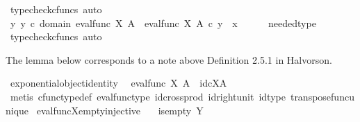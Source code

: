 \begin{isabellebody}
\ {\isacharparenleft}{\kern0pt}typecheck{\isacharunderscore}{\kern0pt}cfuncs{\isacharcomma}{\kern0pt}\ auto{\isacharparenright}{\kern0pt}\isanewline
\ \ \isamarkupfalse%
\ \isamarkupfalse%
\ {\isachardoublequoteopen}{\isasymexists}y{\isachardot}{\kern0pt}\ y\ {\isasymin}\isactrlsub c\ domain\ {\isacharparenleft}{\kern0pt}eval{\isacharunderscore}{\kern0pt}func\ X\ A{\isacharparenright}{\kern0pt}\ {\isasymand}\ eval{\isacharunderscore}{\kern0pt}func\ X\ A\ {\isasymcirc}\isactrlsub c\ y\ {\isacharequal}{\kern0pt}\ x{\isachardoublequoteclose}\isanewline
\ \ \ \ \isamarkupfalse%
\ needed{\isacharunderscore}{\kern0pt}type\ \isamarkupfalse%
\ {\isacharparenleft}{\kern0pt}typecheck{\isacharunderscore}{\kern0pt}cfuncs{\isacharcomma}{\kern0pt}\ auto{\isacharparenright}{\kern0pt}\isanewline
{}\isamarkupfalse%
%
\endisatagproof
{\isafoldproof}%
%
\isadelimproof
%
\endisadelimproof
%
\begin{isamarkuptext}%
The lemma below corresponds to a note above Definition 2.5.1 in Halvorson.%
\end{isamarkuptext}\isamarkuptrue%
\isamarkupfalse%
\ exponential{\isacharunderscore}{\kern0pt}object{\isacharunderscore}{\kern0pt}identity{\isacharcolon}{\kern0pt}\isanewline
\ \ {\isachardoublequoteopen}{\isacharparenleft}{\kern0pt}eval{\isacharunderscore}{\kern0pt}func\ X\ A{\isacharparenright}{\kern0pt}\isactrlsup {\isasymsharp}\ {\isacharequal}{\kern0pt}\ id\isactrlsub c{\isacharparenleft}{\kern0pt}X\isactrlbsup A\isactrlesup {\isacharparenright}{\kern0pt}{\isachardoublequoteclose}\isanewline
%
\isadelimproof
\ \ %
\endisadelimproof
%
\isatagproof
{}\isamarkupfalse%
\ {\isacharparenleft}{\kern0pt}metis\ cfunc{\isacharunderscore}{\kern0pt}type{\isacharunderscore}{\kern0pt}def\ eval{\isacharunderscore}{\kern0pt}func{\isacharunderscore}{\kern0pt}type\ id{\isacharunderscore}{\kern0pt}cross{\isacharunderscore}{\kern0pt}prod\ id{\isacharunderscore}{\kern0pt}right{\isacharunderscore}{\kern0pt}unit\ id{\isacharunderscore}{\kern0pt}type\ transpose{\isacharunderscore}{\kern0pt}func{\isacharunderscore}{\kern0pt}unique{\isacharparenright}{\kern0pt}%
\endisatagproof
{\isafoldproof}%
%
\isadelimproof
\isanewline
%
\endisadelimproof
\isanewline
{}\isamarkupfalse%
\ eval{\isacharunderscore}{\kern0pt}func{\isacharunderscore}{\kern0pt}X{\isacharunderscore}{\kern0pt}empty{\isacharunderscore}{\kern0pt}injective{\isacharcolon}{\kern0pt}\isanewline
\ \ \ {\isachardoublequoteopen}is{\isacharunderscore}{\kern0pt}empty\ Y{\isachardoublequoteclose}\isanewline

\end{isabellebody}
